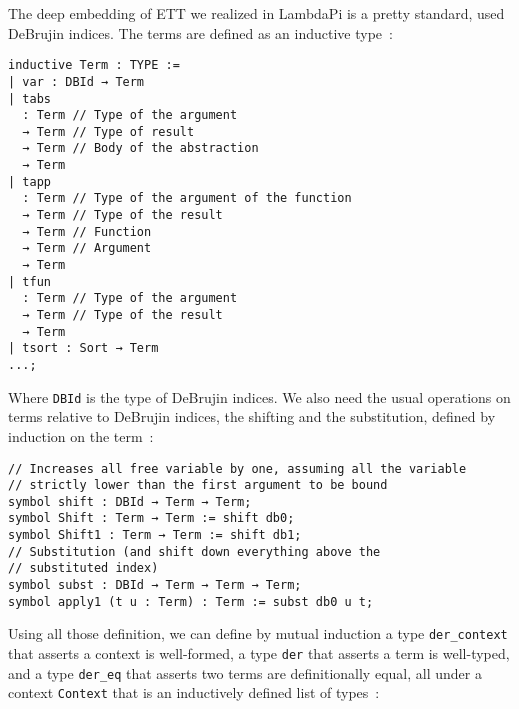 The deep embedding of ETT we realized in LambdaPi is a pretty standard, used
DeBrujin indices. The terms are defined as an inductive type~:

\begin{lstlisting}
inductive Term : TYPE :=
| var : DBId → Term
| tabs
  : Term // Type of the argument
  → Term // Type of result
  → Term // Body of the abstraction
  → Term
| tapp
  : Term // Type of the argument of the function
  → Term // Type of the result
  → Term // Function
  → Term // Argument
  → Term
| tfun
  : Term // Type of the argument
  → Term // Type of the result
  → Term
| tsort : Sort → Term
...;
\end{lstlisting}

Where \texttt{DBId} is the type of DeBrujin indices. We also need the usual
operations on terms relative to DeBrujin indices, the shifting and the
substitution, defined by induction on the term~:

\begin{lstlisting}
// Increases all free variable by one, assuming all the variable
// strictly lower than the first argument to be bound
symbol shift : DBId → Term → Term;
symbol Shift : Term → Term := shift db0;
symbol Shift1 : Term → Term := shift db1;
// Substitution (and shift down everything above the
// substituted index)
symbol subst : DBId → Term → Term → Term;
symbol apply1 (t u : Term) : Term := subst db0 u t;
\end{lstlisting}

Using all those definition, we can define by mutual induction a type
\texttt{der\_context} that asserts a context is well-formed, a type
\texttt{der} that asserts a term is well-typed, and a type \texttt{der\_eq}
that asserts two terms are definitionally equal, all under a context
\texttt{Context} that is an inductively defined list of types~:

